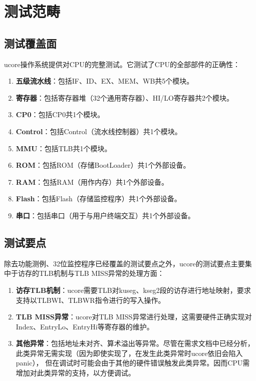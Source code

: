 \section{测试范畴}

\subsection{测试覆盖面}


ucore操作系统提供对CPU的完整测试。它测试了CPU的全部部件的正确性：

\begin{enumerate}
    \item {\bf 五级流水线}：包括IF、ID、EX、MEM、WB共5个模块。
    \item {\bf 寄存器}：包括寄存器堆（32个通用寄存器）、HI/LO寄存器共2个模块。
    \item {\bf CP0}：包括CP0共1个模块。
    \item {\bf Control}：包括Control（流水线控制器）共1个模块。
    \item {\bf MMU}：包括TLB共1个模块。
    \item {\bf ROM}：包括ROM（存储BootLoader）共1个外部设备。
    \item {\bf RAM}：包括RAM（用作内存）共1个外部设备。
    \item {\bf Flash}：包括Flash（存储监控程序）共1个外部设备。
    \item {\bf 串口}：包括串口（用于与用户终端交互）共1个外部设备。
\end{enumerate}

\subsection{测试要点}

除去功能测例、32位监控程序已经覆盖的测试要点之外，ucore的测试要点主要集中于访存的TLB机制与TLB MISS异常的处理方面：

\begin{enumerate}
    \item {\bf 访存TLB机制}：ucore需要TLB对kuseg、kseg2段的访存进行地址映射，要求支持以TLBWI、TLBWR指令进行的写入操作。
    \item {\bf TLB MISS异常}：ucore对TLB MISS异常进行处理，这需要硬件正确实现对Index、EntryLo、EntryHi等寄存器的维护。
    \item {\bf 其他异常}：包括地址未对齐、算术溢出等异常。尽管在需求文档中已经分析，此类异常无需实现（因为即使实现了，在发生此类异常时ucore依旧会陷入panic），
    但在调试时可能会由于其他的硬件错误触发此类异常。因而CPU需增加对此类异常的支持，以方便调试。
\end{enumerate}

